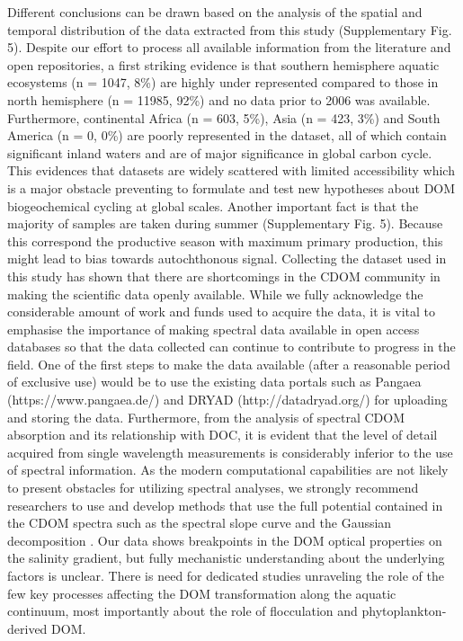Different conclusions can be drawn based on the analysis of the spatial and temporal distribution of the data extracted from this study (Supplementary Fig. 5). Despite our effort to process all available information from the literature and open repositories, a first striking evidence is that southern hemisphere aquatic ecosystems (n = 1047, 8\%) are highly under represented compared to those in north hemisphere (n = 11985, 92\%) and no data prior to 2006 was available. Furthermore, continental Africa (n = 603, 5\%), Asia (n = 423, 3\%) and South America (n = 0, 0\%) are poorly represented in the dataset, all of which contain significant inland waters and are of major significance in global carbon cycle. This evidences that datasets are widely scattered with limited accessibility which is a major obstacle preventing to formulate and test new hypotheses about DOM biogeochemical cycling at global scales. Another important fact is that the majority of samples are taken during summer (Supplementary Fig. 5). Because this correspond the productive season with maximum primary production, this might lead to bias towards autochthonous signal. Collecting the dataset used in this study has shown that there are shortcomings in the CDOM community in making the scientific data openly available. While we fully acknowledge the considerable amount of work and funds used to acquire the data, it is vital to emphasise the importance of making spectral data available in open access databases so that the data collected can continue to contribute to progress in the field. One of the first steps to make the data available (after a reasonable period of exclusive use) would be to use the existing data portals such as Pangaea (https://www.pangaea.de/) and DRYAD (http://datadryad.org/) for uploading and storing the data. Furthermore, from the analysis of spectral CDOM absorption and its relationship with DOC, it is evident that the level of detail acquired from single wavelength measurements is considerably inferior to the use of spectral information. As the modern computational capabilities are not likely to present obstacles for utilizing spectral analyses, we strongly recommend researchers to use and develop methods that use the full potential contained in the CDOM spectra such as the spectral slope curve \citep{Loiselle2009} and the Gaussian decomposition \citep{Massicotte2016MC}. Our data shows breakpoints in the DOM optical properties on the salinity gradient, but fully mechanistic understanding about the underlying factors is unclear. There is need for dedicated studies unraveling the role of the few key processes affecting the DOM transformation along the aquatic continuum, most importantly about the role of flocculation and phytoplankton-derived DOM.

